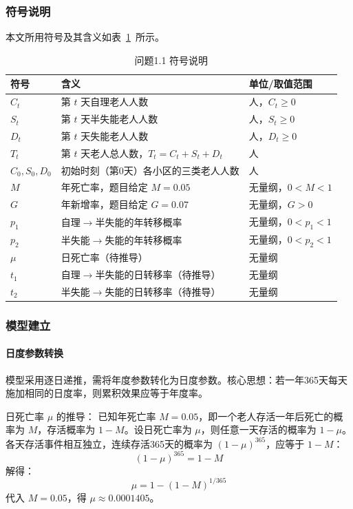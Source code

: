 \documentclass[12pt,a4paper]{article}
\begin{document}
\subsubsection{符号说明}
本文所用符号及其含义如表~\ref{tab:symbols_1.1}~所示。

\begin{table}[htbp]
\centering
\caption{问题1.1 符号说明}
\label{tab:symbols_1.1}
\begin{tabular}{lll}
\toprule
符号 & 含义 & 单位/取值范围 \\
\midrule
$C_t$ & 第 $t$ 天自理老人人数 & 人，$C_t \geq 0$ \\
$S_t$ & 第 $t$ 天半失能老人人数 & 人，$S_t \geq 0$ \\
$D_t$ & 第 $t$ 天失能老人人数 & 人，$D_t \geq 0$ \\
$T_t$ & 第 $t$ 天老人总人数，$T_t = C_t + S_t + D_t$ & 人 \\
$C_0, S_0, D_0$ & 初始时刻（第0天）各小区的三类老人人数 & 人 \\
$M$ & 年死亡率，题目给定 $M=0.05$ & 无量纲，$0 < M < 1$ \\
$G$ & 年新增率，题目给定 $G=0.07$ & 无量纲，$G > 0$ \\
$p_1$ & 自理$\to$半失能的年转移概率 & 无量纲，$0 < p_1 < 1$ \\
$p_2$ & 半失能$\to$失能的年转移概率 & 无量纲，$0 < p_2 < 1$ \\
$\mu$ & 日死亡率（待推导） & 无量纲 \\
$t_1$ & 自理$\to$半失能的日转移率（待推导） & 无量纲 \\
$t_2$ & 半失能$\to$失能的日转移率（待推导） & 无量纲 \\
\bottomrule
\end{tabular}
\end{table}

\subsubsection{模型建立}

\paragraph{日度参数转换}
模型采用逐日递推，需将年度参数转化为日度参数。核心思想：若一年365天每天施加相同的日度率，则累积效果应等于年度率。

日死亡率 $\mu$ 的推导：
已知年死亡率 $M=0.05$，即一个老人存活一年后死亡的概率为 $M$，存活概率为 $1-M$。设日死亡率为 $\mu$，则任意一天存活的概率为 $1-\mu$。各天存活事件相互独立，连续存活365天的概率为 $(1-\mu)^{365}$，应等于 $1-M$：
\begin{equation}
(1-\mu)^{365} = 1 - M
\tag{1.1}
\end{equation}
解得：
\begin{equation}
\mu = 1 - (1 - M)^{1/365}
\tag{1.2}
\end{equation}
代入 $M=0.05$，得 $\mu \approx 0.0001405$。
\end{document}
